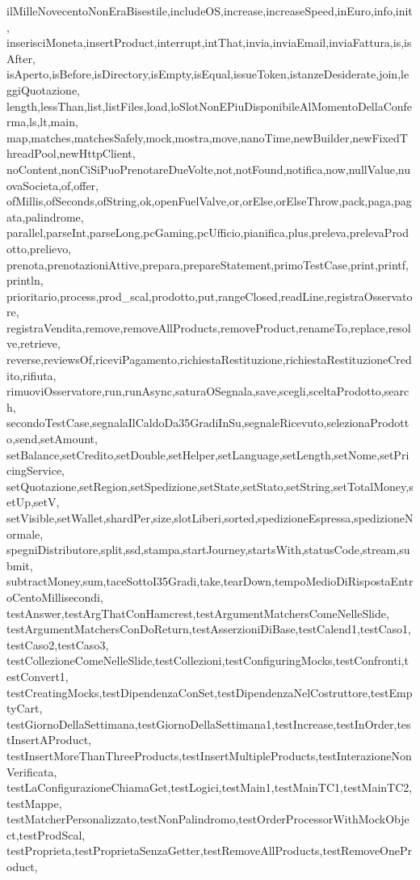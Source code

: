 {{    ilMilleNovecentoNonEraBisestile,includeOS,increase,increaseSpeed,inEuro,info,init,
    inserisciMoneta,insertProduct,interrupt,intThat,invia,inviaEmail,inviaFattura,is,isAfter,
    isAperto,isBefore,isDirectory,isEmpty,isEqual,issueToken,istanzeDesiderate,join,leggiQuotazione,
    length,lessThan,list,listFiles,load,loSlotNonEPiuDisponibileAlMomentoDellaConferma,ls,lt,main,
    map,matches,matchesSafely,mock,mostra,move,nanoTime,newBuilder,newFixedThreadPool,newHttpClient,
    noContent,nonCiSiPuoPrenotareDueVolte,not,notFound,notifica,now,nullValue,nuovaSocieta,of,offer,
    ofMillis,ofSeconds,ofString,ok,openFuelValve,or,orElse,orElseThrow,pack,paga,pagata,palindrome,
    parallel,parseInt,parseLong,pcGaming,pcUfficio,pianifica,plus,preleva,prelevaProdotto,prelievo,
    prenota,prenotazioniAttive,prepara,prepareStatement,primoTestCase,print,printf,println,
    prioritario,process,prod_scal,prodotto,put,rangeClosed,readLine,registraOsservatore,
    registraVendita,remove,removeAllProducts,removeProduct,renameTo,replace,resolve,retrieve,
    reverse,reviewsOf,riceviPagamento,richiestaRestituzione,richiestaRestituzioneCredito,rifiuta,
    rimuoviOsservatore,run,runAsync,saturaOSegnala,save,scegli,sceltaProdotto,search,
    secondoTestCase,segnalaIlCaldoDa35GradiInSu,segnaleRicevuto,selezionaProdotto,send,setAmount,
    setBalance,setCredito,setDouble,setHelper,setLanguage,setLength,setNome,setPricingService,
    setQuotazione,setRegion,setSpedizione,setState,setStato,setString,setTotalMoney,setUp,setV,
    setVisible,setWallet,shardPer,size,slotLiberi,sorted,spedizioneEspressa,spedizioneNormale,
    spegniDistributore,split,ssd,stampa,startJourney,startsWith,statusCode,stream,submit,
    subtractMoney,sum,taceSottoI35Gradi,take,tearDown,tempoMedioDiRispostaEntroCentoMillisecondi,
    testAnswer,testArgThatConHamcrest,testArgumentMatchersComeNelleSlide,
    testArgumentMatchersConDoReturn,testAsserzioniDiBase,testCalend1,testCaso1,testCaso2,testCaso3,
    testCollezioneComeNelleSlide,testCollezioni,testConfiguringMocks,testConfronti,testConvert1,
    testCreatingMocks,testDipendenzaConSet,testDipendenzaNelCostruttore,testEmptyCart,
    testGiornoDellaSettimana,testGiornoDellaSettimana1,testIncrease,testInOrder,testInsertAProduct,
    testInsertMoreThanThreeProducts,testInsertMultipleProducts,testInterazioneNonVerificata,
    testLaConfigurazioneChiamaGet,testLogici,testMain1,testMainTC1,testMainTC2,testMappe,
    testMatcherPersonalizzato,testNonPalindromo,testOrderProcessorWithMockObject,testProdScal,
    testProprieta,testProprietaSenzaGetter,testRemoveAllProducts,testRemoveOneProduct,
}}

